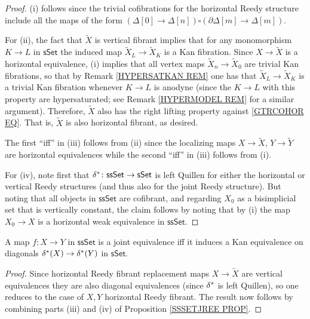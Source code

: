 \documentclass[a4paper,10pt
 ,draft
]{article}%
\begin{document}
\begin{proof}
(i) follows since the trivial cofibrations for the horizontal Reedy structure include all the maps of the form
$(\Delta[0] \to \Delta[n]) \square (\partial \Delta[m] \to \Delta[m])$.

For (ii), the fact that $\tilde{X}$ is vertical fibrant
implies that for any monomorphism $K \to L$ in $\mathsf{sSet}$
the induced map $\tilde{X}_L \to \tilde{X}_K$ is a Kan fibration. 
Since $X \to \tilde{X}$ is a horizontal equivalence,
(i) implies that all vertex maps
$\tilde{X}_{n} \to \tilde{X}_{0}$
are trivial Kan fibrations, so that by
Remark \ref{HYPERSATKAN REM} one has that 
$\tilde{X}_L \to \tilde{X}_K$ is a trivial Kan fibration whenever
$K \to L$ is anodyne
(since the $K \to L$ with this property are hypersaturated; see Remark \ref{HYPERMODEL REM} for a similar argument).
Therefore, $\tilde{X}$ also has the right lifting property against \eqref{GTRCOHOR EQ}. That is, $\tilde{X}$ is also horizontal fibrant, as desired.


The first ``iff'' in (iii) follows from (ii) since the localizing maps 
$X \to \tilde{X}$, $Y \to \tilde{Y}$
are horizontal equivalences
while the second ``iff'' in (iii) follows from (i).

For (iv), note first that 
$\delta^{\**} \colon \mathsf{ssSet} \to \mathsf{sSet}$
is left Quillen for either the horizontal or vertical Reedy structures (and thus also for the joint Reedy structure).
But noting that all objects in $\mathsf{ssSet}$ are cofibrant, and regarding 
$X_{0}$ as a bisimplicial set that is vertically constant, 
the claim follows by noting that by (i) the map
$X_{0} \to X$ is a horizontal weak equivalence in $\mathsf{ssSet}$.
\end{proof}


\begin{corollary}\label{WEAKDIAG COR}
	A map $f\colon X \to Y$ in $\mathsf{ssSet}$ is a joint equivalence iff it induces a Kan equivalence on diagonals
	$\delta^{\**}(X) \to \delta^{\**}(Y)$ in $\mathsf{sSet}$.
\end{corollary}

\begin{proof}
	Since horizontal Reedy fibrant replacement maps
	$X \to \tilde{X}$ are vertical equivalences they are also	
	diagonal equivalences (since $\delta^{\**}$ is left Quillen), 
	so one reduces to the case of $X,Y$ horizontal Reedy fibrant. The result now follows by combining
	parts (iii) and (iv) of Proposition \ref{SSSETJREE PROP}.
\end{proof}
\end{document}
